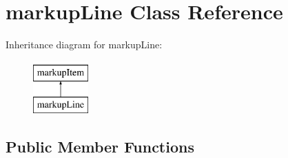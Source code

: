 \hypertarget{classmarkupLine}{
\section{markupLine Class Reference}
\label{classmarkupLine}
}
Inheritance diagram for markupLine:\begin{figure}[H]
\begin{center}
\leavevmode
\includegraphics[height=2.000000cm]{classmarkupLine}
\end{center}
\end{figure}
\subsection*{Public Member Functions}
